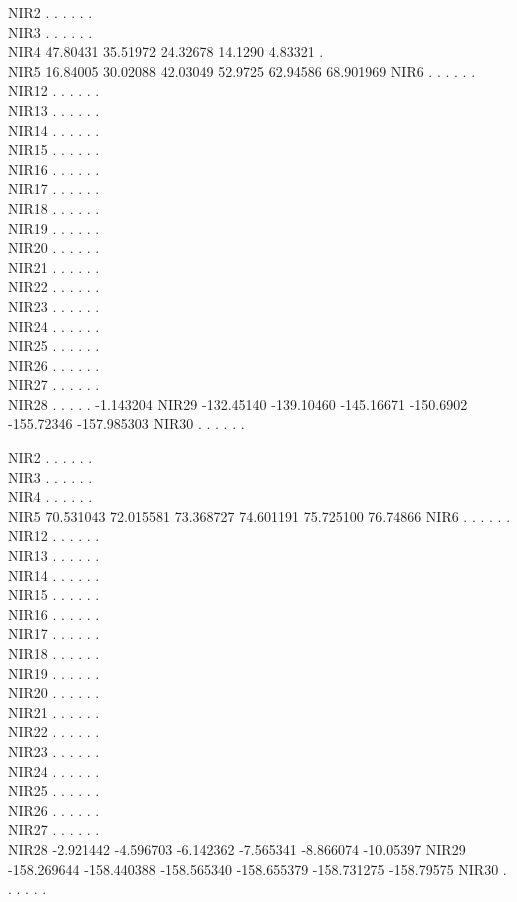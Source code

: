 \documentclass[
]{article}
\begin{document}
NIR2 . . . . . .\\
NIR3 . . . . . .\\
NIR4 47.80431 35.51972 24.32678 14.1290 4.83321 .\\
NIR5 16.84005 30.02088 42.03049 52.9725 62.94586 68.901969 NIR6 . . . .
. .\\
NIR12 . . . . . .\\
NIR13 . . . . . .\\
NIR14 . . . . . .\\
NIR15 . . . . . .\\
NIR16 . . . . . .\\
NIR17 . . . . . .\\
NIR18 . . . . . .\\
NIR19 . . . . . .\\
NIR20 . . . . . .\\
NIR21 . . . . . .\\
NIR22 . . . . . .\\
NIR23 . . . . . .\\
NIR24 . . . . . .\\
NIR25 . . . . . .\\
NIR26 . . . . . .\\
NIR27 . . . . . .\\
NIR28 . . . . . -1.143204 NIR29 -132.45140 -139.10460 -145.16671
-150.6902 -155.72346 -157.985303 NIR30 . . . . . .

NIR2 . . . . . .\\
NIR3 . . . . . .\\
NIR4 . . . . . .\\
NIR5 70.531043 72.015581 73.368727 74.601191 75.725100 76.74866 NIR6 . .
. . . .\\
NIR12 . . . . . .\\
NIR13 . . . . . .\\
NIR14 . . . . . .\\
NIR15 . . . . . .\\
NIR16 . . . . . .\\
NIR17 . . . . . .\\
NIR18 . . . . . .\\
NIR19 . . . . . .\\
NIR20 . . . . . .\\
NIR21 . . . . . .\\
NIR22 . . . . . .\\
NIR23 . . . . . .\\
NIR24 . . . . . .\\
NIR25 . . . . . .\\
NIR26 . . . . . .\\
NIR27 . . . . . .\\
NIR28 -2.921442 -4.596703 -6.142362 -7.565341 -8.866074 -10.05397 NIR29
-158.269644 -158.440388 -158.565340 -158.655379 -158.731275 -158.79575
NIR30 . . . . . .
\end{document}
